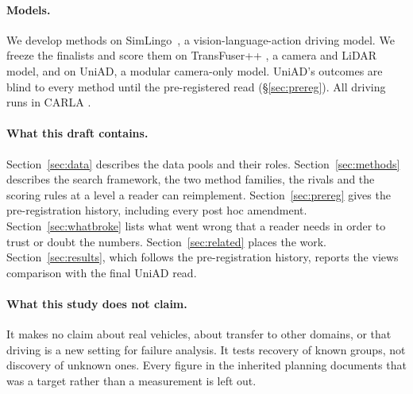\paragraph{Models.}
We develop methods on SimLingo~\cite{Renz2025cvpr}, a vision-language-action
driving model. We freeze the finalists and score them on TransFuser++
\cite{jaeger2023hidden,zimmerlin2024hidden}, a camera and LiDAR model, and on
UniAD, a modular camera-only model. UniAD's outcomes are blind to every method
until the pre-registered read (\S\ref{sec:prereg}). All driving runs in CARLA
\cite{carla2017}.

\paragraph{What this draft contains.}
Section~\ref{sec:data} describes the data pools and their roles.
Section~\ref{sec:methods} describes the search framework, the two method families,
the rivals and the scoring rules at a level a reader can reimplement.
Section~\ref{sec:prereg} gives the pre-registration history, including every
post hoc amendment. Section~\ref{sec:whatbroke} lists what went wrong that a
reader needs in order to trust or doubt the numbers. Section~\ref{sec:related}
places the work. Section~\ref{sec:results}, which follows the pre-registration
history, reports the views comparison with the final UniAD read.

\paragraph{What this study does not claim.}
It makes no claim about real vehicles, about transfer to other domains, or that
driving is a new setting for failure analysis. It tests recovery of known groups,
not discovery of unknown ones. Every figure in the inherited planning documents
that was a target rather than a measurement is left out.
